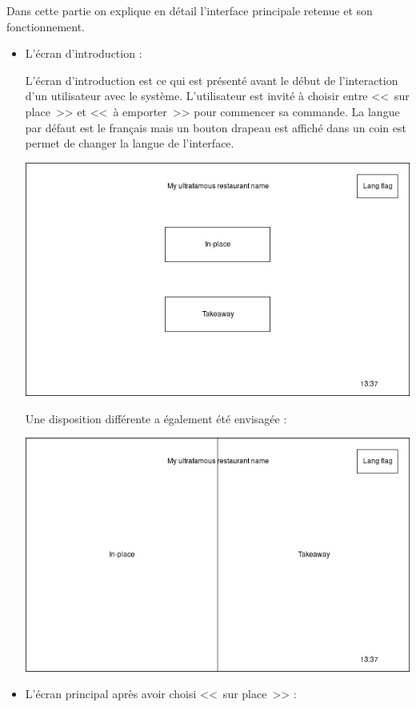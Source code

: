 \documentclass[a4paper,12pt]{article}
\begin{document}
Dans cette partie on explique en détail l'interface principale retenue et son fonctionnement.

\begin{itemize}

\item L'écran d'introduction :

L'écran d'introduction est ce qui est présenté avant le début de l'interaction d'un utilisateur avec le système.
L'utilisateur est invité à choisir entre <<~sur place~>> et <<~à emporter~>> pour commencer sa commande. La langue par
défaut est le français mais un bouton drapeau est affiché dans un coin est permet de changer la langue de l'interface.

\includegraphics[width=13cm]{intro_screen.jpg}

Une disposition différente a également été envisagée :

\includegraphics[width=13cm]{alt_intro_screen.jpg}

\item L'écran principal après avoir choisi <<~sur place~>> :


\end{itemize}
\end{document}
